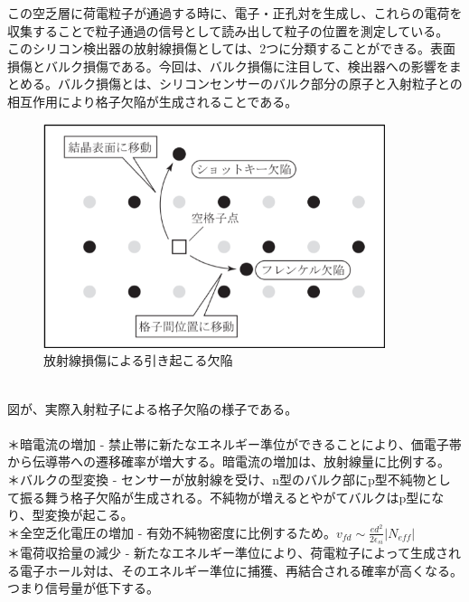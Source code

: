 \documentclass{jreport}
\begin{document}
この空乏層に荷電粒子が通過する時に、電子・正孔対を生成し、これらの電荷を収集することで粒子通過の信号として読み出して粒子の位置を測定している。\\
このシリコン検出器の放射線損傷としては、2つに分類することができる。表面損傷とバルク損傷である。今回は、バルク損傷に注目して、検出器への影響をまとめる。バルク損傷とは、シリコンセンサーのバルク部分の原子と入射粒子との相互作用により格子欠陥が生成されることである。\\
\begin{figure}[htbp]
	\begin{center}
	\includegraphics[width=100mm]{kekkan.png}
	\end{center}
	\caption{放射線損傷による引き起こる欠陥}
	\label{fig:seven}
\end{figure}
\\
図が、実際入射粒子による格子欠陥の様子である。\\
\\
＊暗電流の増加 - 禁止帯に新たなエネルギー準位ができることにより、価電子帯から伝導帯への遷移確率が増大する。暗電流の増加は、放射線量に比例する。\\ 
＊バルクの型変換 - センサーが放射線を受け、n型のバルク部にp型不純物として振る舞う格子欠陥が生成される。不純物が増えるとやがてバルクはp型になり、型変換が起こる。 \\ 
＊全空乏化電圧の増加 - 有効不純物密度に比例するため。$v_{fd} \sim \frac{ed^2}{2\epsilon_{si}}|N_{eff}| $ \\ 
＊電荷収拾量の減少 - 新たなエネルギー準位により、荷電粒子によって生成される電子ホール対は、そのエネルギー準位に捕獲、再結合される確率が高くなる。つまり信号量が低下する。\\
\end{document}
